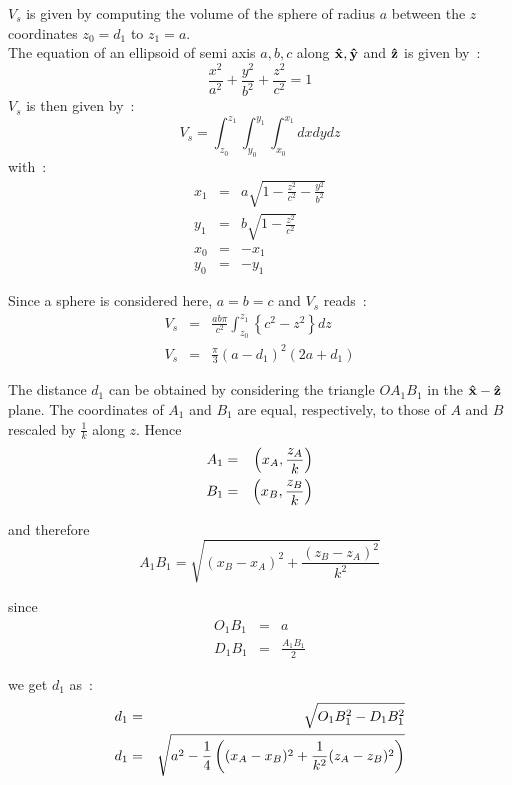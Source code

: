 $V_s$ is given by computing the volume of the sphere of radius $a$ between the $z$ coordinates
 $z_0=d_1$ to $z_1= a$.\\
The equation of an ellipsoid of semi axis $a,b,c$ along $\mathbf{\hat{x} },\mathbf{\hat{y} }$ and $\mathbf{\hat{z} }$
is given by~:
\begin{equation}
	\frac{x^2}{a^2} + \frac{y^2}{b^2} + \frac{z^2}{c^2} = 1
\end{equation}
$V_s$ is then given by~:
\begin{equation}
	V_s = \int^{z_1}_{z_0}\int^{y_1}_{y_0}\int^{x_1}_{x_0} dxdydz
\end{equation}
with~:
\begin{eqnarray*}
	x_1 &=& a\sqrt{1-\frac{z^2}{c^2} - \frac{y^2}{b^2} }	\\
	y_1 &=& b\sqrt{1-\frac{z^2}{c^2}}	\\
	x_0 &=& -x_1	\\
	y_0 &=& -y_1
\end{eqnarray*}

Since a sphere is considered here, $a=b=c$ and $V_s$ reads~:
\begin{eqnarray}
	V_s &=& \frac{ab\pi}{c^2}\int^{z_1}_{z_0} \left\{  c^2 - z^2  \right\}dz \nonumber \\
	V_s &=& \frac{\pi}{3}(a-d_1)^2(2a+d_1)
\end{eqnarray}

The distance $d_1$ can be obtained by considering the triangle $O A_1 B_1$ in the
$\mathbf{\hat{x} }-\mathbf{\hat{z} }$ plane. The coordinates of
$A_1$ and $B_1$ are equal, respectively, to those of $A$ and $B$ rescaled by $\frac{1}{k}$ along
$z$. Hence
\begin{eqnarray*}
	A_1 &=& \left( x_A, \frac{z_A}{k} \right)	\\
	B_1 &=& \left( x_B, \frac{z_B}{k} \right)
\end{eqnarray*}

and therefore
\begin{equation}
	A_1B_1 = \sqrt{ (x_B-x_A)^2 + \frac{(z_B-z_A)^2}{k^2} }
\end{equation}

since
\begin{eqnarray}
	O_1B_1 &=& a	\\
	D_1B_1 &=& \frac{A_1B_1}{2}
\end{eqnarray}

we get $d_1$ as~:
\begin{eqnarray}
	d_1 &=& \sqrt{ O_1B_1^2 - D_1B_1^2 }	\nonumber	\\
	d_1 &=& \sqrt{a^2 - \frac{1}{4}\left(   (x_A-x_B)^2 + \frac{1}{k^2}(z_A-z_B)^2 \right)  }
	\label{eqn:d1Initial}
\end{eqnarray}


